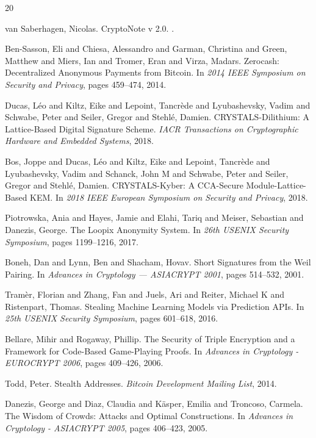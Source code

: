 \documentclass[12pt,a4paper]{article}
\begin{document}

\begin{thebibliography}{20}

van Saberhagen, Nicolas.
\newblock CryptoNote v 2.0.
.

Ben-Sasson, Eli and Chiesa, Alessandro and Garman, Christina and Green, Matthew and Miers, Ian and Tromer, Eran and Virza, Madars.
\newblock Zerocash: Decentralized Anonymous Payments from Bitcoin.
\newblock In \emph{2014 IEEE Symposium on Security and Privacy}, pages 459--474, 2014.

Ducas, Léo and Kiltz, Eike and Lepoint, Tancrède and Lyubashevsky, Vadim and Schwabe, Peter and Seiler, Gregor and Stehlé, Damien.
\newblock CRYSTALS-Dilithium: A Lattice-Based Digital Signature Scheme.
\newblock \emph{IACR Transactions on Cryptographic Hardware and Embedded Systems}, 2018.

Bos, Joppe and Ducas, Léo and Kiltz, Eike and Lepoint, Tancrède and Lyubashevsky, Vadim and Schanck, John M and Schwabe, Peter and Seiler, Gregor and Stehlé, Damien.
\newblock CRYSTALS-Kyber: A CCA-Secure Module-Lattice-Based KEM.
\newblock In \emph{2018 IEEE European Symposium on Security and Privacy}, 2018.

Piotrowska, Ania and Hayes, Jamie and Elahi, Tariq and Meiser, Sebastian and Danezis, George.
\newblock The Loopix Anonymity System.
\newblock In \emph{26th USENIX Security Symposium}, pages 1199--1216, 2017.

Boneh, Dan and Lynn, Ben and Shacham, Hovav.
\newblock Short Signatures from the Weil Pairing.
\newblock In \emph{Advances in Cryptology — ASIACRYPT 2001}, pages 514--532, 2001.

Tramèr, Florian and Zhang, Fan and Juels, Ari and Reiter, Michael K and Ristenpart, Thomas.
\newblock Stealing Machine Learning Models via Prediction APIs.
\newblock In \emph{25th USENIX Security Symposium}, pages 601--618, 2016.

Bellare, Mihir and Rogaway, Phillip.
\newblock The Security of Triple Encryption and a Framework for Code-Based Game-Playing Proofs.
\newblock In \emph{Advances in Cryptology - EUROCRYPT 2006}, pages 409--426, 2006.

Todd, Peter.
\newblock Stealth Addresses.
\newblock \emph{Bitcoin Development Mailing List}, 2014.

Danezis, George and Diaz, Claudia and Käsper, Emilia and Troncoso, Carmela.
\newblock The Wisdom of Crowds: Attacks and Optimal Constructions.
\newblock In \emph{Advances in Cryptology - ASIACRYPT 2005}, pages 406--423, 2005.

\end{thebibliography}
\end{document}

